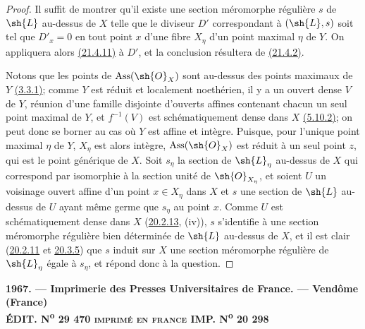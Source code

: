 \begin{proof}
Il suffit de montrer qu'il existe une section méromorphe régulière $s$
de $\sh{L}$ au-dessus de $X$ telle que le diviseur $D'$ correspondant
à $(\sh{L},s)$ soit tel que $D'_x=0$ en tout point $x$ d'une fibre
$X_\eta$ d'un point maximal $\eta$ de $Y$. On appliquera alors
{\hyperlink{ega4.c04.cor.21-4-11}{(21.4.11)}} à $D'$, et la conclusion
résultera de {\hyperlink{ega4.c04.def.21-4-2}{(21.4.2)}}.

Notons que les points de $\operatorname{Ass}(\sh{O}_X)$ sont au-dessus
des points maximaux de $Y$ {\hyperref[canon-index.ega4.c04.prop.3-3-1]{(3.3.1)}};
comme $Y$ est réduit et localement noethérien, il y a un ouvert dense
$V$ de $Y$, réunion d'une famille disjointe d'ouverts affines contenant
chacun un seul point maximal de $Y$, et $f^{-1}(V)$ est
schématiquement dense dans $X$
{\hyperref[canon-index.ega4.c04.prop.5-10-2]{(5.10.2)}}; on peut donc se borner au
cas où $Y$ est affine et intègre. Puisque, pour l'unique point maximal
$\eta$ de $Y$, $X_\eta$ est alors intègre,
$\operatorname{Ass}(\sh{O}_X)$ est réduit à un seul point $z$, qui est
le point générique de $X$. Soit $s_\eta$ la section de $\sh{L}_\eta$
au-dessus de $X$ qui correspond par isomorphie à la section unité
de $\sh{O}_{X_\eta}$, et soient $U$ un voisinage ouvert affine d'un
point $x\in X_\eta$ dans $X$ et $s$ une section de $\sh{L}$ au-dessus
de $U$ ayant même germe que $s_\eta$ au point $x$. Comme $U$ est
schématiquement dense dans $X$
({\hyperlink{ega4.c04.statement.20-2-13}{20.2.13}}, (iv)), $s$
s'identifie à une section méromorphe régulière bien déterminée de
$\sh{L}$ au-dessus de $X$, et il est clair
({\hyperlink{ega4.c04.prop.20-2-11}{20.2.11}} et
{\hyperlink{ega4.c04.prop.20-3-5}{20.3.5}}) que $s$ induit sur $X$
une section méromorphe régulière de $\sh{L}_\eta$ égale à $s_\eta$, et
répond donc à la question.
\end{proof}

\bigskip
\begin{center}
\small\bfseries
1967. --- Imprimerie des Presses Universitaires de France. --- Vendôme
(France)\\
ÉDIT. N\textsuperscript{o} 29 470\qquad
\textsc{imprimé en france}\qquad
IMP. N\textsuperscript{o} 20 298
\end{center}
